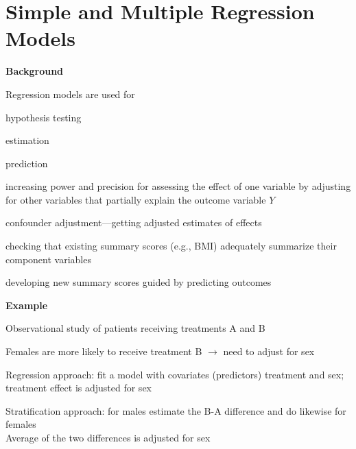 

\chapter{Simple and Multiple Regression Models}
{\larger\textbf{Background}}

Regression models are used for
\bi
\item hypothesis testing
\item estimation
\item prediction
\item increasing power and precision for assessing the effect of one
  variable by adjusting for other variables that partially explain the outcome
  variable $Y$
\item confounder adjustment---getting adjusted estimates of effects
\item checking that existing summary scores (e.g., BMI) adequately
  summarize their component variables
\item developing new summary scores guided by predicting outcomes
\ei

{\larger\textbf{Example}}
\bi
\item Observational study of patients receiving treatments A and B
\item Females are more likely to receive treatment B $\rightarrow$
  need to adjust for sex
\item Regression approach: fit a model with covariates (predictors)
  treatment and sex; treatment effect is adjusted for sex
\item Stratification approach: for males estimate the B-A difference
  and do likewise for females\\Average of the two differences is
  adjusted for sex
\ei

